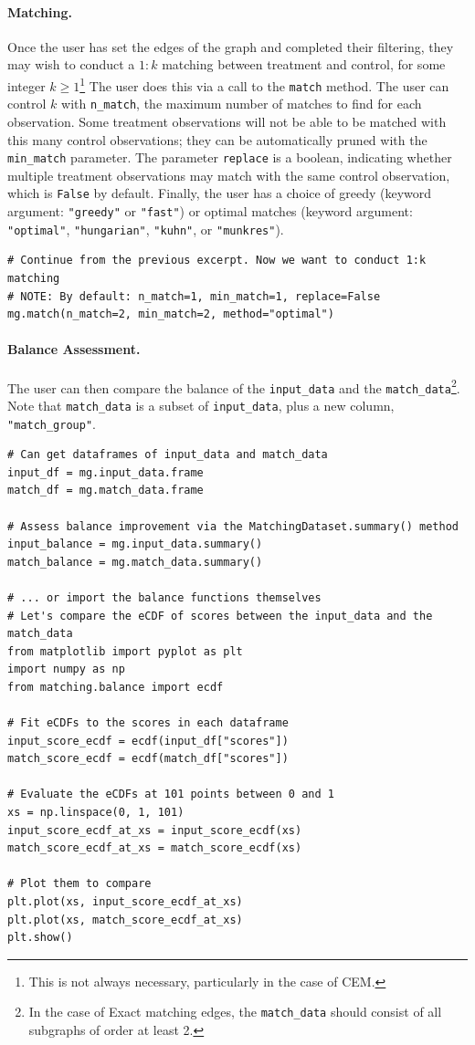 \documentclass[11pt]{extarticle}
\begin{document}
\paragraph{Matching.} Once the user has set the edges of the graph and completed their filtering, they may wish to conduct a $1:k$ matching between treatment and control, for some integer $k \geq 1$\footnote{This is not always necessary, particularly in the case of CEM.}
The user does this via a call to the \texttt{match} method. The user can control $k$ with \texttt{n\_match}, the maximum number of matches to find for each observation. Some treatment observations will not be able to be matched with this many control observations; they can be automatically pruned with the \texttt{min\_match} parameter. The parameter \texttt{replace} is a boolean, indicating whether multiple treatment observations may match with the same control observation, which is \texttt{False} by default. Finally, the user has a choice of greedy (keyword argument: \texttt{"greedy"} or \texttt{"fast"}) or optimal matches (keyword argument: \texttt{"optimal"}, \texttt{"hungarian"}, \texttt{"kuhn"}, or \texttt{"munkres"}).
\begin{verbatim}
# Continue from the previous excerpt. Now we want to conduct 1:k matching
# NOTE: By default: n_match=1, min_match=1, replace=False
mg.match(n_match=2, min_match=2, method="optimal")
\end{verbatim}

\paragraph{Balance Assessment.} The user can then compare the balance of the \texttt{input\_data} and the \texttt{match\_data}\footnote{In the case of Exact matching edges, the \texttt{match\_data} should consist of all subgraphs of order at least 2.}. Note that \texttt{match\_data} is a subset of \texttt{input\_data}, plus a new column, \texttt{"match\_group"}.
\begin{verbatim}
# Can get dataframes of input_data and match_data
input_df = mg.input_data.frame
match_df = mg.match_data.frame

# Assess balance improvement via the MatchingDataset.summary() method
input_balance = mg.input_data.summary()
match_balance = mg.match_data.summary()

# ... or import the balance functions themselves
# Let's compare the eCDF of scores between the input_data and the match_data
from matplotlib import pyplot as plt
import numpy as np
from matching.balance import ecdf

# Fit eCDFs to the scores in each dataframe
input_score_ecdf = ecdf(input_df["scores"])
match_score_ecdf = ecdf(match_df["scores"])

# Evaluate the eCDFs at 101 points between 0 and 1
xs = np.linspace(0, 1, 101)
input_score_ecdf_at_xs = input_score_ecdf(xs)
match_score_ecdf_at_xs = match_score_ecdf(xs)

# Plot them to compare
plt.plot(xs, input_score_ecdf_at_xs)
plt.plot(xs, match_score_ecdf_at_xs)
plt.show()
\end{verbatim}
\end{document}
